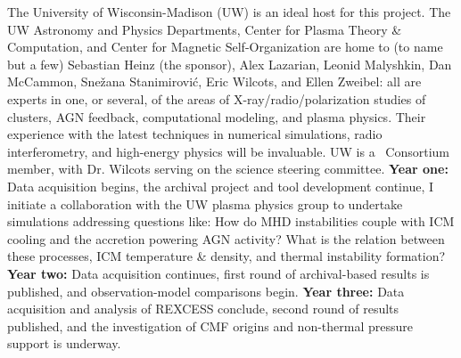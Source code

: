 \indent The University of Wisconsin-Madison (UW) is an ideal host for
this project. The UW Astronomy and Physics Departments, Center for
Plasma Theory \& Computation, and Center for Magnetic
Self-Organization are home to (to name but a few) Sebastian Heinz (the
sponsor), Alex Lazarian, Leonid Malyshkin, Dan McCammon, Sne\v{z}ana
Stanimirovi\'{c}, Eric Wilcots, and Ellen Zweibel: all are experts in
one, or several, of the areas of X-ray/radio/polarization studies of
clusters, AGN feedback, computational modeling, and plasma
physics. Their experience with the latest techniques in numerical
simulations, radio interferometry, and high-energy physics will be
invaluable. UW is a \ska\ Consortium member, with Dr. Wilcots serving
on the science steering committee. {\bf{Year one:}} Data acquisition
begins, the archival project and tool development continue, I initiate
a collaboration with the UW plasma physics group to undertake
simulations addressing questions like: How do MHD instabilities couple
with ICM cooling and the accretion powering AGN activity?  What is the
relation between these processes, ICM temperature \& density, and
thermal instability formation? {\bf{Year two:}} Data acquisition
continues, first round of archival-based results is published, and
observation-model comparisons begin. {\bf{Year three:}} Data
acquisition and analysis of REXCESS conclude, second round of results
published, and the investigation of CMF origins and non-thermal
pressure support is underway.

